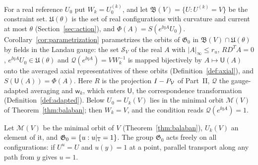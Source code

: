 \begin{readingbox}
For a real reference $U_0$ put $W_k=U_0^{(k)}$, and let $\mathfrak B(V)=\{U:U^{(k)}=V\}$ be the constraint set. $\mathfrak U(\theta)$ is the set of real configurations with curvature and current at most $\theta$ (Section~\ref{sec:action}), and $\Phi(A)=S(e^{\ii\eta A}U_0)$. Corollary~\ref{cor:parametrization} parametrizes the orbits of $\mathfrak G_0$ in $\mathfrak B(V)\cap\mathfrak U(\theta)$ by fields in the Landau gauge: the set $\mathcal S_V$ of the real $A$ with $|A|_\infty\le r_u$, $RD^TA=0$, $e^{\ii\eta A}U_0\in\mathfrak U(\theta)$ and $\mathcal Q(e^{\ii\eta A})=VW_k^{-1}$ is mapped bijectively by $A\mapsto\mathsf U(A)$ onto the averaged axial representatives of these orbits (Definition~\ref{def:axial}), and $S(\mathsf U(A))=\Phi(A)$. Here $R$ is the projection $I-P_\mathcal V$ of Part~II, $\mathcal Q$ the gauge-adapted averaging and $\mathsf w_k$, which enters $\mathsf U$, the correspondence transformation (Definition~\ref{def:adapted}). Below $U_0=U_k(V)$ lies in the minimal orbit $\mathscr M(V)$ of Theorem~\ref{thm:balaban}; then $W_k=V$, and the condition reads $\mathcal Q(e^{\ii\eta A})=1$.
\end{readingbox}
Let $\mathscr M(V)$ be the minimal orbit of $V$ (Theorem~\ref{thm:balaban}), $U_k(V)$ an element of it, and $\mathfrak G_0=\{u:u|_\mathbb T=1\}$. The group $\mathfrak G_0$ acts freely on all configurations: if $U^u=U$ and $u(y)=1$ at a point, parallel transport along any path from $y$ gives $u=1$.

